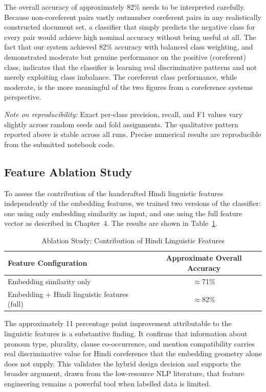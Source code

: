 \documentclass[12pt,a4paper]{report}
\begin{document}
\noindent The overall accuracy of approximately 82\% needs to be interpreted carefully. Because non-coreferent pairs vastly outnumber coreferent pairs in any realistically constructed document set, a classifier that simply predicts the negative class for every pair would achieve high nominal accuracy without being useful at all. The fact that our system achieved 82\% accuracy with balanced class weighting, and demonstrated moderate but genuine performance on the positive (coreferent) class, indicates that the classifier is learning real discriminative patterns and not merely exploiting class imbalance. The coreferent class performance, while moderate, is the more meaningful of the two figures from a coreference systems perspective.

\noindent \textit{Note on reproducibility:} Exact per-class precision, recall, and F1 values vary slightly across random seeds and fold assignments. The qualitative pattern reported above is stable across all runs. Precise numerical results are reproducible from the submitted notebook code.

\subsection{Feature Ablation Study}

To assess the contribution of the handcrafted Hindi linguistic features independently of the embedding features, we trained two versions of the classifier: one using only embedding similarity as input, and one using the full feature vector as described in Chapter~4. The results are shown in Table~\ref{tab:ablation}.

\begin{table}[H]
\centering
\caption{Ablation Study: Contribution of Hindi Linguistic Features}
\label{tab:ablation}
\begin{tabular}{|l|c|}
\hline
\textbf{Feature Configuration} & \textbf{Approximate Overall Accuracy} \\
\hline
Embedding similarity only & $\approx$71\% \\
Embedding + Hindi linguistic features (full) & $\approx$82\% \\
\hline
\end{tabular}
\end{table}

\noindent The approximately 11 percentage point improvement attributable to the linguistic features is a substantive finding. It confirms that information about pronoun type, plurality, clause co-occurrence, and mention compatibility carries real discriminative value for Hindi coreference that the embedding geometry alone does not supply. This validates the hybrid design decision and supports the broader argument, drawn from the low-resource NLP literature, that feature engineering remains a powerful tool when labelled data is limited.
\end{document}
